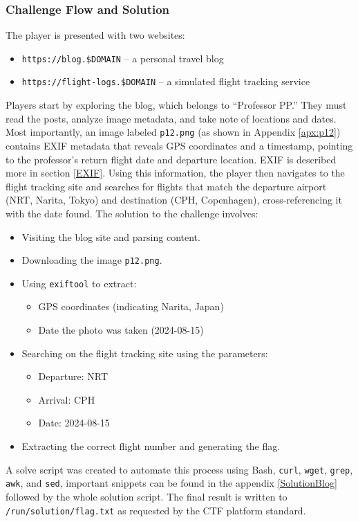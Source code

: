 \subsubsection{Challenge Flow and Solution}
The player is presented with two websites:
\begin{itemize}
    \item \texttt{https://blog.\$DOMAIN} – a personal travel blog
    \item \texttt{https://flight-logs.\$DOMAIN} – a simulated flight tracking service
\end{itemize}
Players start by exploring the blog, which belongs to “Professor PP.” They must read the posts, analyze image metadata, and take note of locations and dates. Most importantly, an image labeled \texttt{p12.png} (as shown in Appendix \ref{apx:p12}) contains EXIF metadata that reveals GPS coordinates and a timestamp, pointing to the professor's return flight date and departure location. EXIF is described more in section \ref{EXIF}. Using this information, the player then navigates to the flight tracking site and searches for flights that match the departure airport (NRT, Narita, Tokyo) and destination (CPH, Copenhagen), cross-referencing it with the date found. The solution to the challenge involves:
\begin{itemize}
    \item Visiting the blog site and parsing content.
    \item Downloading the image \texttt{p12.png}.
    \item Using \texttt{exiftool} to extract:
        \begin{itemize}
            \item GPS coordinates (indicating Narita, Japan)
            \item Date the photo was taken (2024-08-15)
        \end{itemize}
    \item Searching on the flight tracking site using the parameters:
        \begin{itemize}
            \item Departure: NRT
            \item Arrival: CPH
            \item Date: 2024-08-15
        \end{itemize}
    \item Extracting the correct flight number and generating the flag.
\end{itemize}
A solve script was created to automate this process using Bash\cite{Bash}, \texttt{curl}\cite{curl}, \texttt{wget}\cite{Wget}, \texttt{grep}\cite{grep}, \texttt{awk}\cite{Awk}, and \texttt{sed}\cite{Sed}, important snippets can be found in the appendix \ref{SolutionBlog} followed by the whole solution script. The final result is written to \texttt{/run/solution/flag.txt} as requested by the CTF platform standard.




